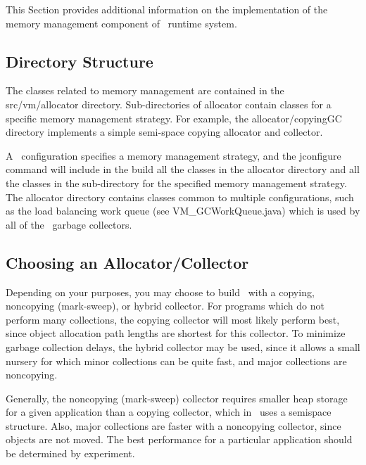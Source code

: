 This Section provides additional information on the implementation
of the memory management component of \jp\ runtime system.
 
\subsection{Directory Structure} \label{sssec:directories}
The classes related to memory management are contained in the 
src/vm/allocator directory.  Sub-directories of allocator 
contain classes for a specific memory management strategy.
For example, the allocator/copyingGC directory implements a
simple semi-space copying allocator and collector.

A \jp\ configuration specifies a memory management strategy, 
and the jconfigure command will include in the build all the
classes in the allocator directory and all the classes in the
sub-directory for the specified memory management strategy.
The allocator directory contains classes common to multiple
configurations, such as the load balancing work queue (see
VM\_GCWorkQueue.java) which is used by all of the \jp\
garbage collectors.

\subsection{Choosing an Allocator/Collector} \label{sssec:choosinggc}
Depending on your purposes, you may choose to build \jp\
with a copying, noncopying (mark-sweep), or hybrid collector.
For programs which do not perform many collections, the
copying collector will most likely perform best, since object
allocation path lengths are shortest for this collector.  To
minimize garbage collection delays, the hybrid collector may
be used, since it allows a small nursery for which minor collections
can be quite fast, and major collections are noncopying.  

Generally, the noncopying (mark-sweep)
collector requires smaller heap storage for a given application	
than a copying collector, which in \jp\ uses a semispace structure.
Also, major collections are faster with a noncopying collector,
since objects are not moved.  The best performance for a particular	
application should be determined by experiment.

